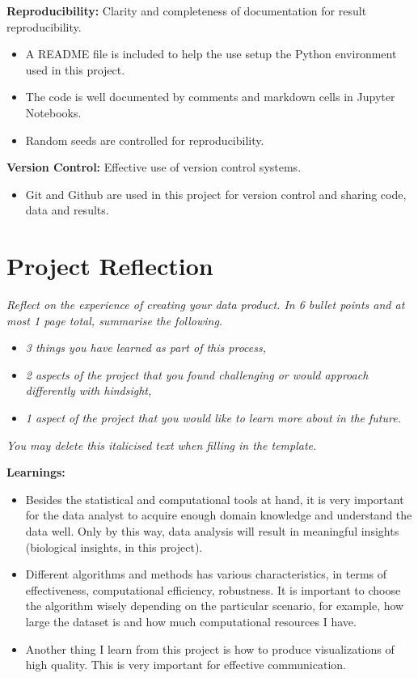 \documentclass[a4paper, 12pt]{article}
\begin{document}
\textbf{Reproducibility:} Clarity and completeness of documentation for result reproducibility.

\begin{itemize}
    \item A README file is included to help the use setup the Python environment used in this project.
    \item The code is well documented by comments and markdown cells in Jupyter Notebooks.
    \item Random seeds are controlled for reproducibility.
\end{itemize}

\textbf{Version Control:} Effective use of version control systems.

\begin{itemize}
    \item Git and Github are used in this project for version control and sharing code, data and results.
\end{itemize}

\pagebreak

\section{Project Reflection}

\textit{Reflect on the experience of creating your data product. In 6 bullet points and at most 1 page total, summarise the following.} 

\begin{itemize}
    \item \textit{3 things you have learned as part of this process,}
    \item \textit{2 aspects of the project that you found challenging or would approach differently with hindsight,} 
    \item \textit{1 aspect of the project that you would like to learn more about in the future.}
\end{itemize}

\textit{You may delete this italicised text when filling in the template.} 

\textbf{Learnings:}

\begin{itemize}
    \item Besides the statistical and computational tools at hand, it is very important for the data analyst to acquire enough domain knowledge and understand the data well. Only by this way, data analysis will result in meaningful insights (biological insights, in this project).
    \item Different algorithms and methods has various characteristics, in terms of effectiveness, computational efficiency, robustness. It is important to choose the algorithm wisely depending on the particular scenario, for example, how large the dataset is and how much computational resources I have.
    \item Another thing I learn from this project is how to produce visualizations of high quality. This is very important for effective communication. 
\end{itemize}
\end{document}
